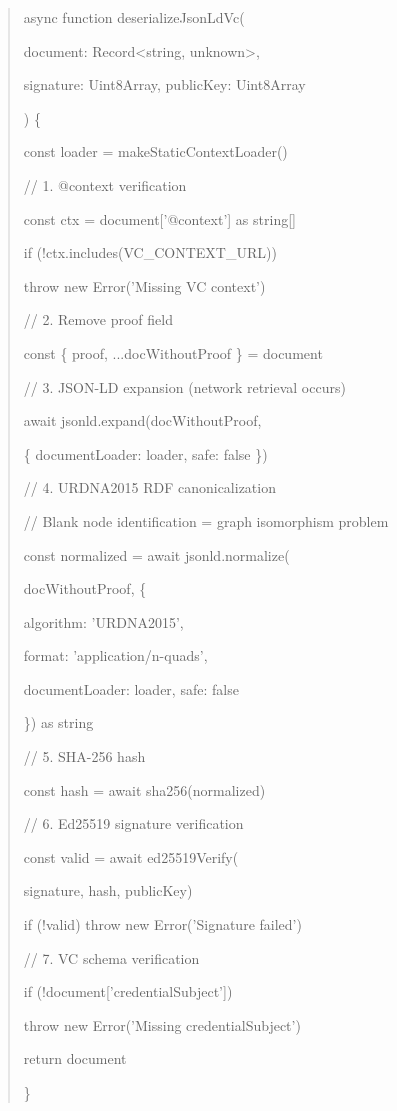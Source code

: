 \documentclass[conference]{IEEEtran}
\begin{document}
\begin{quote}
async function deserializeJsonLdVc(

document: Record\textless string, unknown\textgreater,

signature: Uint8Array, publicKey: Uint8Array

) \{

const loader = makeStaticContextLoader()

// 1. @context verification

const ctx = document{[}'@context'{]} as string{[}{]}

if (!ctx.includes(VC\_CONTEXT\_URL))

throw new Error('Missing VC context')

// 2. Remove proof field

const \{ proof, ...docWithoutProof \} = document

// 3. JSON-LD expansion (network retrieval occurs)

await jsonld.expand(docWithoutProof,

\{ documentLoader: loader, safe: false \})

// 4. URDNA2015 RDF canonicalization

// Blank node identification = graph isomorphism problem

const normalized = await jsonld.normalize(

docWithoutProof, \{

algorithm: 'URDNA2015',

format: 'application/n-quads',

documentLoader: loader, safe: false

\}) as string

// 5. SHA-256 hash

const hash = await sha256(normalized)

// 6. Ed25519 signature verification

const valid = await ed25519Verify(

signature, hash, publicKey)

if (!valid) throw new Error('Signature failed')

// 7. VC schema verification

if (!document{[}'credentialSubject'{]})

throw new Error('Missing credentialSubject')

return document

\}
\end{quote}
\end{document}
